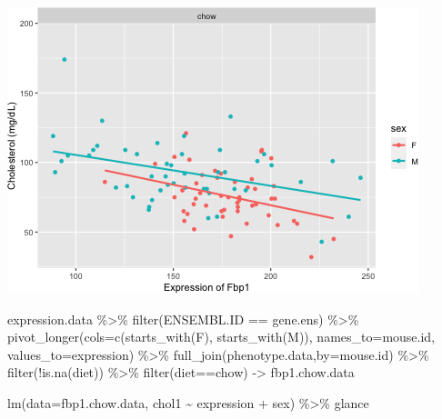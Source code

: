 \documentclass[
]{article}
\newenvironment{Shaded}{\begin{snugshade}}{\end{snugshade}}
\newcommand{\AttributeTok}[1]{\textcolor[rgb]{0.77,0.63,0.00}{#1}}
\newcommand{\FunctionTok}[1]{\textcolor[rgb]{0.00,0.00,0.00}{#1}}
\newcommand{\NormalTok}[1]{#1}
\newcommand{\OtherTok}[1]{\textcolor[rgb]{0.56,0.35,0.01}{#1}}
\newcommand{\SpecialCharTok}[1]{\textcolor[rgb]{0.00,0.00,0.00}{#1}}
\newcommand{\StringTok}[1]{\textcolor[rgb]{0.31,0.60,0.02}{#1}}
\begin{document}
\includegraphics{figures/Fbp1-associations-2.png}

\begin{Shaded}
\begin{Highlighting}[]
\NormalTok{expression.data }\SpecialCharTok{\%\textgreater{}\%}
  \FunctionTok{filter}\NormalTok{(ENSEMBL.ID }\SpecialCharTok{==}\NormalTok{ gene.ens) }\SpecialCharTok{\%\textgreater{}\%}
  \FunctionTok{pivot\_longer}\NormalTok{(}\AttributeTok{cols=}\FunctionTok{c}\NormalTok{(}\FunctionTok{starts\_with}\NormalTok{(}\StringTok{\textquotesingle{}F\textquotesingle{}}\NormalTok{),}
                      \FunctionTok{starts\_with}\NormalTok{(}\StringTok{\textquotesingle{}M\textquotesingle{}}\NormalTok{)),}
               \AttributeTok{names\_to=}\StringTok{\textquotesingle{}mouse.id\textquotesingle{}}\NormalTok{,}
               \AttributeTok{values\_to=}\StringTok{\textquotesingle{}expression\textquotesingle{}}\NormalTok{) }\SpecialCharTok{\%\textgreater{}\%}
  \FunctionTok{full\_join}\NormalTok{(phenotype.data,}\AttributeTok{by=}\StringTok{\textquotesingle{}mouse.id\textquotesingle{}}\NormalTok{) }\SpecialCharTok{\%\textgreater{}\%}
  \FunctionTok{filter}\NormalTok{(}\SpecialCharTok{!}\FunctionTok{is.na}\NormalTok{(diet)) }\SpecialCharTok{\%\textgreater{}\%}
  \FunctionTok{filter}\NormalTok{(diet}\SpecialCharTok{==}\StringTok{\textquotesingle{}chow\textquotesingle{}}\NormalTok{) }\OtherTok{{-}\textgreater{}}\NormalTok{ fbp1.chow.data}

\FunctionTok{lm}\NormalTok{(}\AttributeTok{data=}\NormalTok{fbp1.chow.data, chol1 }\SpecialCharTok{\textasciitilde{}}\NormalTok{ expression }\SpecialCharTok{+}\NormalTok{ sex) }\SpecialCharTok{\%\textgreater{}\%}
\NormalTok{  glance}
\end{Highlighting}
\end{Shaded}
\end{document}
